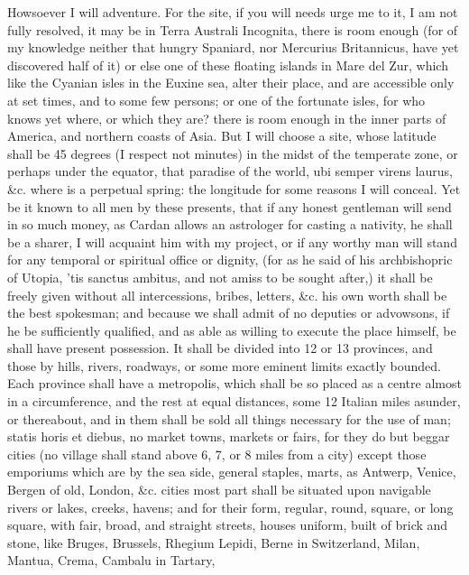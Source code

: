 {Howsoever I will adventure. For the site, if you will needs urge me to
it, I am not fully resolved, it may be in Terra Australi Incognita,
there is room enough (for of my knowledge neither that hungry Spaniard,
nor Mercurius Britannicus, have yet discovered half of it) or else
one of these floating islands in Mare del Zur, which like the Cyanian
isles in the Euxine sea, alter their place, and are accessible only at
set times, and to some few persons; or one of the fortunate isles, for
who knows yet where, or which they are? there is room enough in the
inner parts of America, and northern coasts of Asia. But I will choose
a site, whose latitude shall be 45 degrees (I respect not minutes) in
the midst of the temperate zone, or perhaps under the equator, that
paradise of the world, ubi semper virens laurus, \&c. where is a
perpetual spring: the longitude for some reasons I will conceal. Yet be
it known to all men by these presents, that if any honest gentleman
will send in so much money, as Cardan allows an astrologer for casting
a nativity, he shall be a sharer, I will acquaint him with my project,
or if any worthy man will stand for any temporal or spiritual office or
dignity, (for as he said of his archbishopric of Utopia, 'tis sanctus
ambitus, and not amiss to be sought after,) it shall be freely given
without all intercessions, bribes, letters, \&c. his own worth shall be
the best spokesman; and because we shall admit of no deputies or
advowsons, if he be sufficiently qualified, and as able as willing to
execute the place himself, be shall have present possession. It shall
be divided into 12 or 13 provinces, and those by hills, rivers,
roadways, or some more eminent limits exactly bounded. Each province
shall have a metropolis, which shall be so placed as a centre almost in
a circumference, and the rest at equal distances, some 12 Italian miles
asunder, or thereabout, and in them shall be sold all things necessary
for the use of man; statis horis et diebus, no market towns, markets or
fairs, for they do but beggar cities (no village shall stand above 6,
7, or 8 miles from a city) except those emporiums which are by the sea
side, general staples, marts, as Antwerp, Venice, Bergen of old,
London, \&c. cities most part shall be situated upon navigable rivers or
lakes, creeks, havens; and for their form, regular, round, square, or
long square, with fair, broad, and straight streets, houses
uniform, built of brick and stone, like Bruges, Brussels, Rhegium
Lepidi, Berne in Switzerland, Milan, Mantua, Crema, Cambalu in Tartary,
}
